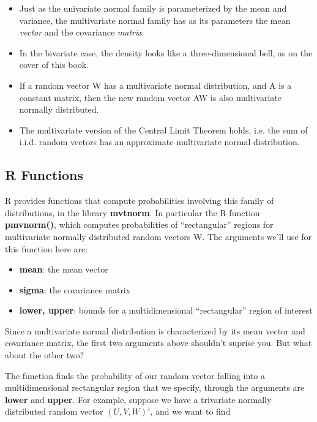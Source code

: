 \begin{itemize}

\item Just as the univariate normal family is parameterized by the mean and
variance, the multivariate normal family has as its parameters the mean
{\it vector} and the covariance {\it matrix}.  

\item In the bivariate case, the density looks like a three-dimensional
bell, as on the cover of this book.

\item If a random vector W has a multivariate normal distribution, and A
is a constant matrix, then the new random vector AW is also multivariate
normally distributed.

\item The multivariate version of the Central Limit Theorem holds, i.e.
the sum of i.i.d. random vectors has an approximate multivariate normal
distribution.

\end{itemize}

\subsection{R Functions}

R provides functions that compute probabilities involving this family of
distributions, in the library {\bf mvtnorm}.  In particular  the R
function {\bf pmvnorm()}, which computes probabilities of
``rectangular'' regions for multivariate normally distributed random
vectors W.  The arguments we'll use for this function here are:

\begin{itemize}

\item {\bf mean}: the mean vector

\item {\bf sigma}: the covariance matrix

\item {\bf lower, upper}: bounds for a multidimensional ``rectangular''
region of interest

\end{itemize}

Since a multivariate normal distribution is characterized by its mean
vector and covariance matrix, the first two arguments above shouldn't
suprise you.  But what about the other two?

The function finds the probability of our random vector falling into a
multidimensional rectangular region that we specify, through the
arguments are {\bf lower} and {\bf upper}.  For example, suppose we have
a trivariate normally distributed random vector $(U,V,W)'$, and we
want to find 

